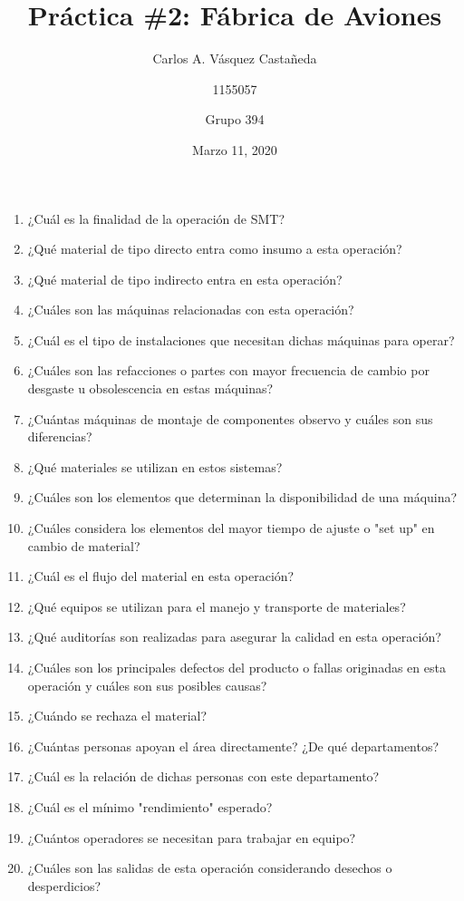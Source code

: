 \documentclass[12pt, letterpaper]{article}
\title{Práctica \#2: Fábrica de Aviones}
\author{Carlos A. Vásquez Castañeda \and 1155057 \and Grupo 394}
\date{Marzo 11, 2020}
\begin{document}
\maketitle

\begin{enumerate}
	\item ¿Cuál es la finalidad de la operación de SMT?
	\item ¿Qué material de tipo directo entra como insumo a esta operación?
	\item ¿Qué material de tipo indirecto entra en esta operación?
	\item ¿Cuáles son las máquinas relacionadas con esta operación?
	\item ¿Cuál es el tipo de instalaciones que necesitan dichas máquinas para operar?
	\item ¿Cuáles son las refacciones o partes con mayor frecuencia de cambio por desgaste u obsolescencia en estas máquinas?
	\item ¿Cuántas máquinas de montaje de componentes observo y cuáles son sus diferencias?
	\item ¿Qué materiales se utilizan en estos sistemas?
	\item ¿Cuáles son los elementos que determinan la disponibilidad de una máquina?
	\item ¿Cuáles considera los elementos del mayor tiempo de ajuste o "set up" en cambio de material?
	\item ¿Cuál es el flujo del material en esta operación?
	\item ¿Qué equipos se utilizan para el manejo y transporte de materiales?
	\item ¿Qué auditorías son realizadas para asegurar la calidad en esta operación?
	\item ¿Cuáles son los principales defectos del producto o fallas originadas en esta operación y cuáles son sus posibles causas?
	\item ¿Cuándo se rechaza el material?
	\item ¿Cuántas personas apoyan el área directamente? ¿De qué departamentos?
	\item ¿Cuál es la relación de dichas personas con este departamento?
	\item ¿Cuál es el mínimo "rendimiento" esperado?
	\item ¿Cuántos operadores se necesitan para trabajar en equipo?
	\item ¿Cuáles son las salidas de esta operación considerando desechos o desperdicios?
\end{enumerate}

\renewcommand\refname{References}
\printbibliography
\end{document}
